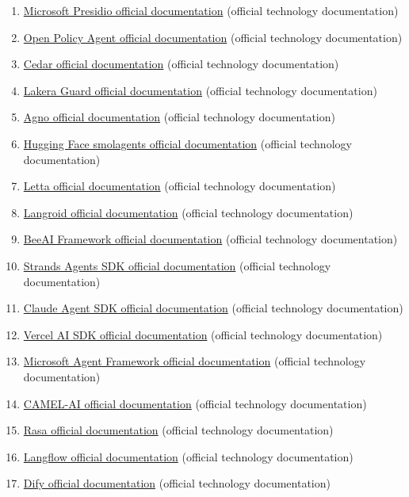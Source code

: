 \begin{enumerate}
\item \href{https://microsoft.github.io/presidio/}{Microsoft Presidio official documentation} (official technology documentation)
\item \href{https://www.openpolicyagent.org/docs/latest/}{Open Policy Agent official documentation} (official technology documentation)
\item \href{https://docs.cedarpolicy.com/}{Cedar official documentation} (official technology documentation)
\item \href{https://docs.lakera.ai/docs}{Lakera Guard official documentation} (official technology documentation)
\item \href{https://docs.agno.com/}{Agno official documentation} (official technology documentation)
\item \href{https://huggingface.co/docs/smolagents/index}{Hugging Face smolagents official documentation} (official technology documentation)
\item \href{https://docs.letta.com/}{Letta official documentation} (official technology documentation)
\item \href{https://langroid.github.io/langroid/}{Langroid official documentation} (official technology documentation)
\item \href{https://framework.beeai.dev/}{BeeAI Framework official documentation} (official technology documentation)
\item \href{https://github.com/strands-agents/harness-sdk}{Strands Agents SDK official documentation} (official technology documentation)
\item \href{https://platform.claude.com/docs/en/agent-sdk/overview}{Claude Agent SDK official documentation} (official technology documentation)
\item \href{https://ai-sdk.dev/docs/introduction}{Vercel AI SDK official documentation} (official technology documentation)
\item \href{https://learn.microsoft.com/en-us/agent-framework/overview/}{Microsoft Agent Framework official documentation} (official technology documentation)
\item \href{https://docs.camel-ai.org/}{CAMEL-AI official documentation} (official technology documentation)
\item \href{https://rasa.com/docs/}{Rasa official documentation} (official technology documentation)
\item \href{https://docs.langflow.org/}{Langflow official documentation} (official technology documentation)
\item \href{https://docs.dify.ai/}{Dify official documentation} (official technology documentation)

\end{enumerate}
